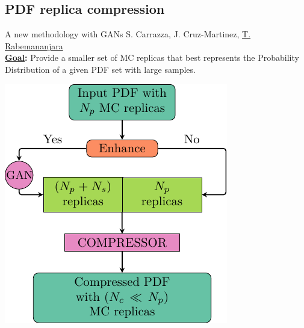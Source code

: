 \providecommand{\iRef}[1]{{\tiny\color{HallowGreen} $[$#1$]$}}

\author[Tanjona Rabemananjara]{}

\subsection{PDF replica compression}

\begin{frame}{A new methodology with GANs}
	S. Carrazza, J. Cruz-Martinez, \underline{T. Rabemananjara} \\
	\textbf{\textcolor{HallowGreen}{\underline{Goal}:}} Provide a smaller set of MC 
	replicas that best represents the Probability Distribution of a given PDF set 
	with large samples.
	\vspace*{-0.1cm}	
	\begin{center}
	\includegraphics[height=.7\textheight]{./gan_compressor/imgs/pygans.pdf}
	\end{center}
\end{frame}

